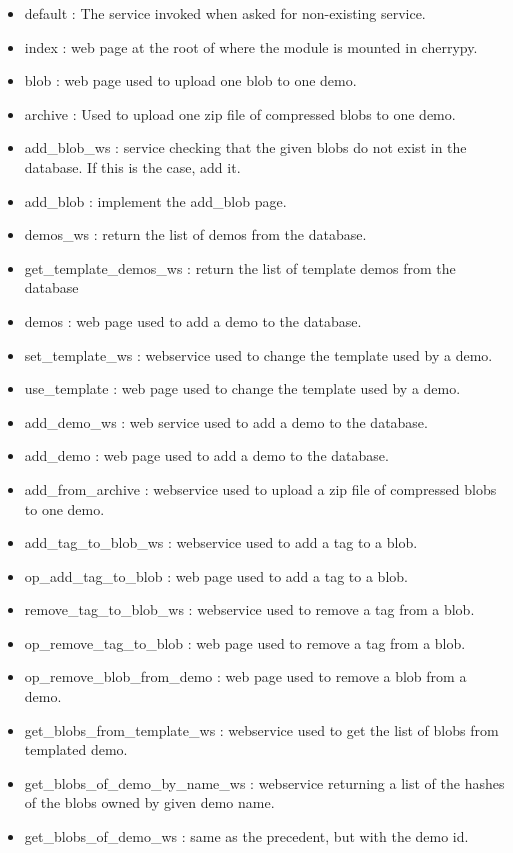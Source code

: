 \begin{itemize}
\item default : The service invoked when asked for non-existing service.
\item index : web page at the root of where the module is mounted in cherrypy.
\item blob : web page used to upload one blob to one demo.
\item archive : Used to upload one zip file of compressed blobs to one demo.
\item add\_blob\_ws : service checking that the given blobs do not exist in the database. If this is the case, add it.
\item add\_blob : implement the add\_blob page.
\item demos\_ws : return the list of demos from the database.
\item get\_template\_demos\_ws : return the list of template demos from the database
\item demos : web page used to add a demo to the database.
\item set\_template\_ws : webservice used to change the template used by a demo.
\item use\_template : web page used to change the template used by a demo.
\item add\_demo\_ws : web service used to add a demo to the database.
\item add\_demo : web page used to add a demo to the database.
\item add\_from\_archive : webservice used to upload a zip file of compressed blobs to one demo.
\item add\_tag\_to\_blob\_ws : webservice used to add a tag to a blob.
\item op\_add\_tag\_to\_blob : web page used to add a tag to a blob.
\item remove\_tag\_to\_blob\_ws : webservice used to remove a tag from a blob.
\item op\_remove\_tag\_to\_blob : web page used to remove a tag from a blob.
\item op\_remove\_blob\_from\_demo : web page used to remove a blob from a demo.
\item get\_blobs\_from\_template\_ws : webservice used to get the list of blobs from templated demo.
\item get\_blobs\_of\_demo\_by\_name\_ws : webservice returning a list of the hashes of the blobs owned by given demo name.
\item get\_blobs\_of\_demo\_ws : same as the precedent, but with the demo id.

\end{itemize}
